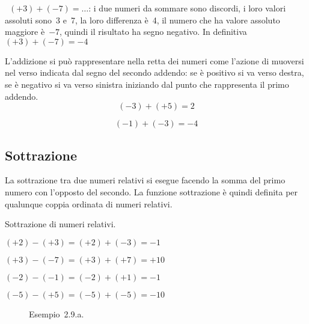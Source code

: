  \begin{esempio}
~\((+3)+(-7)=\ldots\): i due numeri da sommare sono discordi, i loro valori 
assoluti sono~3 e~7, la loro differenza è~4,
il numero che ha valore assoluto maggiore è~\(-7\), quindi il risultato ha 
segno 
negativo.
In definitiva~\((+3)+(-7)=-4\)
 \end{esempio}

L'addizione si può rappresentare nella retta dei numeri come l'azione di 
muoversi nel verso indicata dal segno del
secondo addendo: se è positivo si va verso destra, se è negativo si va 
verso 
sinistra iniziando dal punto che
rappresenta il primo addendo.
 \[(-3)+(+5)=2\]
\begin{center}
 
\end{center}
\[ (-1)+(-3) = -4\]
\begin{center}
 
\end{center}

\subsection{Sottrazione}

La sottrazione tra due numeri relativi si esegue facendo la somma del primo 
numero con l'opposto del secondo.
La funzione sottrazione è quindi definita per qualunque coppia ordinata di 
numeri relativi.

 \begin{esempio}
 Sottrazione di numeri relativi.
 \begin{enumeratea}
 \item \((+2)-(+3)=(+2)+(-3)=-1\)
\item \((+3)-(-7)=(+3)+(+7)=+10\)
\item \((-2)-(-1)=(-2)+(+1)=-1\)
\item \((-5)-(+5)=(-5)+(-5)=-10\)
 \end{enumeratea}
 \end{esempio}

\begin{inaccessibleblock}
 \begin{figure}[t]
 \centering
 \caption{Esempio~2.9.a.}
\end{figure}
\end{inaccessibleblock}

